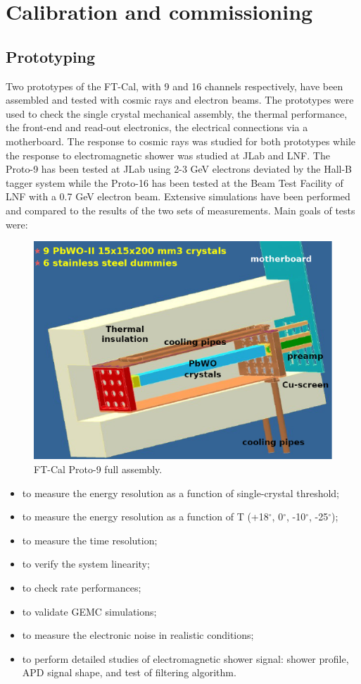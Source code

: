 \section{Calibration and commissioning}
\subsection{Prototyping}
Two prototypes of the FT-Cal, with 9 and 16 channels respectively, have been assembled and tested with cosmic rays and electron beams. The prototypes were used to check 
the single crystal mechanical assembly, the thermal performance, the front-end and read-out electronics, 
the electrical connections via a motherboard.
The response to cosmic rays was studied for both prototypes while the response to electromagnetic shower was studied at JLab and LNF.
The Proto-9 has been  tested at JLab using 2-3 GeV
electrons deviated by the Hall-B tagger system  while the Proto-16 has been tested at the Beam Test Facility of LNF with a 0.7 GeV electron beam.  Extensive simulations have been performed and compared to the results of the two sets of measurements. 
Main goals of  tests were:

\begin{figure}
\includegraphics[width=1.0\columnwidth]{./fig/p9-whole.eps}
\caption{FT-Cal Proto-9 full assembly.}
\label{fig:p9-whole}
\end{figure}

\begin{itemize}
\item to measure the energy resolution as a function of single-crystal threshold;
\item to measure the energy resolution as a function of T (+18$^\circ$, 0$^\circ$, -10$^\circ$, -25$^\circ$);
\item to measure the time resolution;
\item to verify the system linearity;
\item to check rate performances;
\item to validate GEMC simulations;
\item to measure the electronic noise in realistic conditions;
\item to perform detailed studies of electromagnetic shower signal: shower profile, APD signal shape, and test of filtering algorithm.
\end{itemize}

